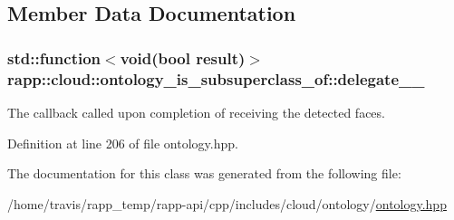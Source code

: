 \subsection{Member Data Documentation}
\hypertarget{classrapp_1_1cloud_1_1ontology__is__subsuperclass__of_a43a9210f6b949ae2042a25627e9fcff5}{
\subsubsection[{delegate\-\_\-\-\_\-}]{\setlength{\rightskip}{0pt plus 5cm}std\-::function$<$void(bool result)$>$ rapp\-::cloud\-::ontology\-\_\-is\-\_\-subsuperclass\-\_\-of\-::delegate\-\_\-\-\_\-\hspace{0.3cm}{\ttfamily [private]}}}\label{classrapp_1_1cloud_1_1ontology__is__subsuperclass__of_a43a9210f6b949ae2042a25627e9fcff5}


The callback called upon completion of receiving the detected faces. 



Definition at line 206 of file ontology.\-hpp.



The documentation for this class was generated from the following file\-:\begin{DoxyCompactItemize}
\item 
/home/travis/rapp\-\_\-temp/rapp-\/api/cpp/includes/cloud/ontology/\hyperlink{ontology_8hpp}{ontology.\-hpp}\end{DoxyCompactItemize}
